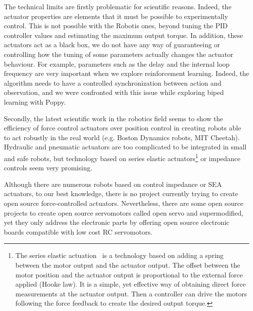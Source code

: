 The technical limits are firstly problematic for scientific reasons. Indeed, the actuator properties are elements that it must be possible to experimentally control. This is not possible with the Robotis ones, beyond tuning the PID controller values and estimating the maximum output torque. In addition, these actuators act as a black box, we do not have any way of guaranteeing or controlling how the tuning of some parameters actually changes the actuator behaviour. For example, parameters such as the delay and the internal loop frequency are very important when we explore reinforcement learning. Indeed, the algorithm needs to have a controlled synchronization between action and observation, and we were confronted with this issue while exploring biped learning with Poppy.

Secondly, the latest scientific work in the robotics field seems to show the efficiency of force control actuators over position control in creating robots able to act robustly in the real world (e.g. Boston Dynamics robots, MIT Cheetah). Hydraulic and pneumatic actuators are too complicated to be integrated in small and safe robots, but technology based on series elastic actuators\footnote{The series elastic actuation~\parencite{pratt1995series} is a technology based on adding a spring between the motor output and the actuator output. The offset between the motor position and the actuator output is proportional to the external force applied (Hooke law). It is a simple, yet effective way of obtaining direct force measurements at the actuator output. Then a controller can drive the motors following the force feedback to create the desired output torque.} or impedance controls seem very promising.





Although there are numerous robots based on control impedance or SEA actuators, to our best knowledge, there is no project currently trying to create open source force-controlled actuators. Nevertheless, there are some open source projects to create open source servomotors called open servo and supermodified, yet they only address the electronic parts by offering open source electronic boards compatible with low cost RC servomotors.


